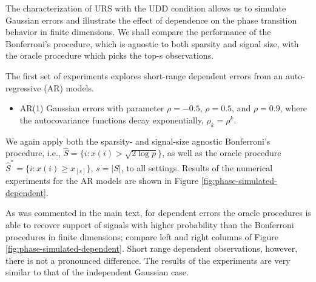 
The characterization of \ac{URS} with the UDD condition allows us to simulate Gaussian errors and illustrate the effect of dependence on the phase transition behavior in finite dimensions.
We shall compare the performance of the Bonferroni's procedure, which is agnostic to both sparsity and signal size, with the oracle procedure which picks the top-s observations.

The first set of experiments explores short-range dependent errors from an auto-regressive (AR) models.
\begin{itemize}
	\item AR(1) Gaussian errors with parameter $\rho = -0.5$, $\rho = 0.5$, and $\rho = 0.9$,
	where the autocovariance functions decay exponentially, 
	$\rho_{k} = \rho^{k}$.
\end{itemize}
We again apply both the sparsity- and signal-size agnostic Bonferroni's procedure, i.e., $\widehat{S} = \{i:x(i)>\sqrt{2\log{p}}\}$, as well as the oracle procedure $\widehat{S}^* = \{i:x(i)\ge x_{[s]}\}$, $s=|S|$, to all settings.
Results of the numerical experiments for the AR models are shown in Figure \ref{fig:phase-simulated-dependent}.

As was commented in the main text, for dependent errors the oracle procedures is able to recover support of signals with higher probability than the Bonferroni procedures in finite dimensions; compare left and right columns of Figure \ref{fig:phase-simulated-dependent}.
Short range dependent observations, however, there is not a pronounced difference.
The results of the experiments are very similar to that of the independent Gaussian case.

